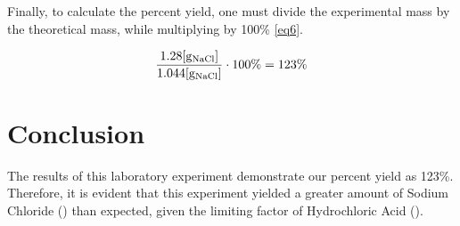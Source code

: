 \documentclass{article}
\begin{document}
\begin{justify}

  Finally, to calculate the percent yield, one must divide the experimental mass by the theoretical mass, while multiplying by 100\% \eqref{eq6}.

\begin{equation} \label{eq6}
  \frac{1.28[\si{\gram}_{\ce{NaCl}}]}{1.044[\si{\gram}_{\ce{NaCl}}]} \cdot 100\% = 123\%
\end{equation}

\end{justify}

\section{Conclusion}

\begin{justify}

  The results of this laboratory experiment demonstrate our percent yield as 123\%. Therefore, it is evident that this experiment yielded a greater amount of Sodium Chloride () than expected, given the limiting factor of Hydrochloric Acid (). 

\end{justify}
\end{document}
